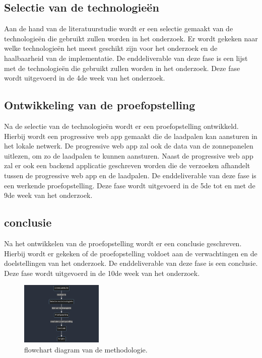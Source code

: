 \subsection{Selectie van de technologieën}%
\label{sub:selectie_van_de_technologieen}
Aan de hand van de literatuurstudie wordt er een selectie gemaakt van de technologieën die gebruikt zullen worden in het onderzoek. Er wordt gekeken naar welke technologieën het meest geschikt zijn voor het onderzoek en de haalbaarheid van de implementatie. De enddeliverable van deze fase is een lijst met de technologieën die gebruikt zullen worden in het onderzoek. Deze fase wordt uitgevoerd in de 4de week van het onderzoek.

\subsection{Ontwikkeling van de proefopstelling}%
\label{sub:ontwikkeling_van_de_proefopstelling}
Na de selectie van de technologieën wordt er een proefopstelling ontwikkeld. Hierbij wordt een progressive web app gemaakt die de laadpalen kan aansturen in het lokale netwerk. De progressive web app zal ook de data van de zonnepanelen uitlezen, om zo de laadpalen te kunnen aansturen. Naast de progressive web app zal er ook een backend applicatie geschreven worden die de verzoeken afhandelt tussen de progressive web app en de laadpalen. De enddeliverable van deze fase is een werkende proefopstelling. Deze fase wordt uitgevoerd in de 5de tot en met de 9de week van het onderzoek.

\subsection{conclusie}%
\label{sub:conclusie_methodologie}
Na het ontwikkelen van de proefopstelling wordt er een conclusie geschreven. Hierbij wordt er gekeken of de proefopstelling voldoet aan de verwachtingen en de doelstellingen van het onderzoek. De enddeliverable van deze fase is een conclusie. Deze fase wordt uitgevoerd in de 10de week van het onderzoek.


\begin{figure}[b]
  \centering
  \includegraphics[width=0.35\textwidth,height=0.35\textheight,keepaspectratio]{./graphics/mermaid-diagram.png}
  \caption{flowchart diagram van de methodologie.}
  \label{fig:flowchart}
\end{figure}

